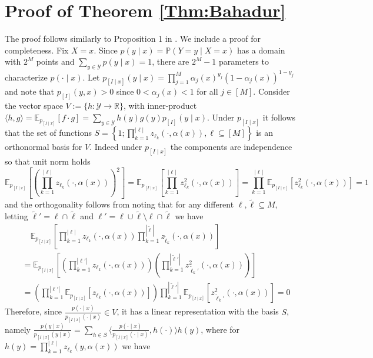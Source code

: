 \documentclass[11pt]{article}
\begin{document}
\section{Proof of Theorem \ref{Thm:Bahadur}}
The proof follows similarly to Proposition 1 in  \cite{bahadur1959representation}. We include a proof for completeness.  Fix $X=x$. Since $p(y\mid x)=\mathbb{P}(Y=y\mid X=x)$ has a domain with $2^M$ points and $\sum_{y\in\mathcal{Y}}p(y\mid x) = 1$, there are $2^M-1$ parameters to characterize $p(\cdot\mid x)$. Let $p_{[I\mid x]}(y\mid x) = \prod_{j=1}^M \alpha_j(x)^{y_j}(1-\alpha_j(x))^{1-y_j}$ and note that $p_{[I]}(y,x)>0$ since $0<\alpha_j(x)<1$ for all $j\in[M]$. Consider the vector space $V:=\{ h: \mathcal{Y} \to \mathbb{R} \} $, with inner-product $\langle h,g\rangle = \mathbb{E}_{p_{[I\mid x]}}[f\cdot g] = \sum_{y \in \mathcal{Y}} h(y)g(y)p_{[I]}(y\mid x)$.
Under $p_{[I\mid x]}$ it follows that the set of functions $S=\left\{1; \prod_{k=1}^{|\ell|} z_{\ell_k}(\cdot,\alpha(x)),  \ell \subseteq [M] \right\}$
is an orthonormal basis for $V$. Indeed under $p_{[I\mid x]}$ the components are independence so that unit norm holds $$\mathbb{E}_{p_{[I\mid x]}}\left[ \left(\prod_{k=1}^{|\ell|} z_{\ell_k}(\cdot ,\alpha(x))\right)^2\right]=\mathbb{E}_{p_{[I\mid x]}}\left[ \prod_{k=1}^{|\ell|} z_{\ell_k}^2(\cdot ,\alpha(x))\right]=\prod_{k=1}^{|\ell|} \mathbb{E}_{p_{[I\mid x]}}[z_{\ell_k}^2(\cdot ,\alpha(x))]=1$$ 
and the orthogonality follows from noting that for any different $\ell,\tilde\ell \subseteq M$, letting $\tilde \ell' = \ell \cap  \tilde \ell$ and $\ell' = \ell \cup  \tilde \ell \setminus \ell \cap  \tilde \ell$ we have
{$$\begin{array}{rl} 
&\displaystyle\quad \mathbb{E}_{p_{[I\mid x]}}\left[\prod_{k=1}^{|\ell|} z_{\ell_k}(\cdot ,\alpha(x)) \prod_{k=1}^{|\tilde \ell|} z_{\tilde \ell_k}(\cdot ,\alpha(x))\right] \\ 
&\displaystyle=\mathbb{E}_{p_{[I\mid x]}}\left[\left(\prod_{k=1}^{|\ell'|} z_{\ell_k}(\cdot,\alpha(x))\right) \left(\prod_{k=1}^{|\tilde \ell'|} z_{\tilde \ell_k'}^2(\cdot,\alpha(x))\right)\right]\\
&\displaystyle = \left(\prod_{k=1}^{|\ell'|} \mathbb{E}_{p_{[I\mid x]}}\left[ z_{\ell_k}( \cdot,\alpha(x))\right]\right) \prod_{k=1}^{|\tilde \ell'|}\mathbb{E}_{p_{[I\mid x]}}[  z_{\tilde \ell_k'}^2( \cdot,\alpha(x))]=0
\end{array}$$}
Therefore, since $\frac{p(\cdot\mid x)}{p_{[I\mid x]}(\cdot\mid x)} \in V$, it has a linear representation with the basis $S$, namely $\frac{p(y\mid x)}{p_{[I\mid x]}(y\mid x)} = \sum_{h \in S} \langle \frac{p(\cdot\mid x)}{p_{[I\mid x]}(\cdot\mid x)}, h(\cdot)\rangle h(y)$, where for $h(y)= \prod_{k=1}^{|\ell|}z_{\ell_k}(y,\alpha(x))$ we have
\end{document}
